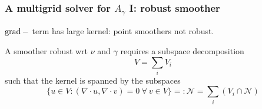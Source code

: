 \documentclass[presentation]{beamer}
\DeclareMathOperator{\grad}{grad}
\let\div\relax
\DeclareMathOperator{\div}{div}
\begin{document}
\begin{frame}
  \frametitle{A multigrid solver for $A_\gamma$ I: robust smoother}
  $\grad-\div$ term has large kernel: point smoothers not robust.

  \begin{theorem}
    A smoother robust wrt $\nu$ and $\gamma$ requires a subspace
    decomposition
    \begin{equation*}
      V = \sum_i V_i
    \end{equation*}
    such that the kernel is spanned by the subspaces
    \begin{equation*}
      \{u \in V : (\nabla \cdot u, \nabla \cdot v) =
      0 \ \forall\ v \in V\} =: \mathcal{N} = \sum_i \left(V_i \cap \mathcal{N} \right)
    \end{equation*}
  \end{theorem}
\end{frame}
\end{document}
